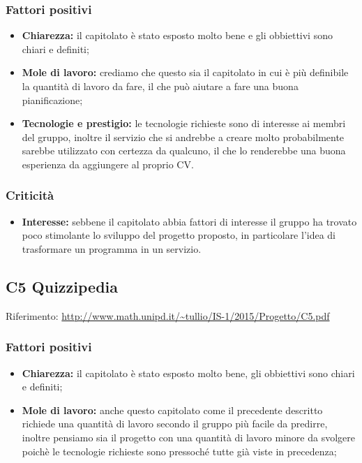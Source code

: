 \documentclass{scalatekids-article}
\begin{document}
\subsubsection{Fattori positivi}
\begin{itemize}
  \item \textbf{Chiarezza:} il capitolato è stato esposto molto bene e gli obbiettivi sono chiari e definiti;
  \item \textbf{Mole di lavoro:} crediamo che questo sia il capitolato in cui è più definibile la quantità di lavoro da fare, il che può aiutare a fare una buona pianificazione;
  \item \textbf{Tecnologie e prestigio:} le tecnologie richieste sono di interesse ai membri del gruppo, inoltre il servizio che si andrebbe a creare molto probabilmente sarebbe utilizzato con certezza da qualcuno, il che lo renderebbe una buona esperienza da aggiungere al proprio CV. 
\end{itemize}
\subsubsection{Criticità}
\begin{itemize}
  \item \textbf{Interesse:} sebbene il capitolato abbia fattori di interesse il gruppo ha trovato poco stimolante lo sviluppo del progetto proposto, in particolare l'idea di trasformare un programma in un servizio. 
\end{itemize}

\subsection{C5 Quizzipedia}
Riferimento: \url{http://www.math.unipd.it/~tullio/IS-1/2015/Progetto/C5.pdf}\\
\subsubsection{Fattori positivi}
\begin{itemize}
  \item \textbf{Chiarezza:} il capitolato è stato esposto molto bene, gli obbiettivi sono chiari e definiti;
  \item \textbf{Mole di lavoro:} anche questo capitolato come il precedente descritto richiede una quantità di lavoro secondo il gruppo più facile da predirre, inoltre pensiamo sia il progetto con una quantità di lavoro minore da svolgere poichè le tecnologie richieste sono pressoché tutte già viste in precedenza;
\end{itemize}
\end{document}
